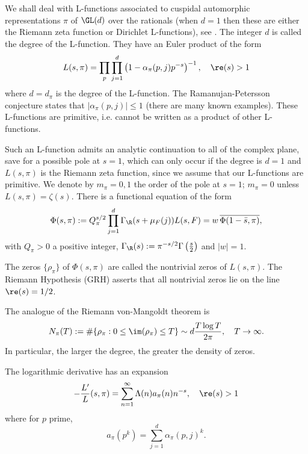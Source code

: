 \documentclass[12pt]{amsart}
\begin{document}
We shall deal with L-functions associated to cuspidal automorphic representations $\pi$ of $\GL(d)$ over the rationals   %
 (when $d=1$ then these are either the Riemann zeta function or Dirichlet L-functions), see \cite{RSDuke}. The integer $d$ is called the degree of the L-function. 
They have an Euler product of the form 
\[
L(s,\pi) = \prod_p \prod_{j=1}^{d} \left(1-\alpha_\pi(p,j) p^{-s} \right)^{-1},\quad \re(s)>1 
\] 
where $d=d_\pi$ is the degree of the L-function. 
The Ramanujan-Petersson conjecture states that $|\alpha_\pi(p,j)|\leq 1$ (there are many known examples). 
These L-functions are primitive, i.e. cannot be written as a product of other L-functions.  

Such an L-function  admits an analytic continuation to all of the complex plane, save for a possible pole at $s=1$, which can only occur if the degree is $d=1$ and $L(s,\pi)$ is   the Riemann zeta function, since we assume that our L-functions are primitive. We denote by $m_\pi=0,1$ the order of the pole at $s=1$; $m_\pi=0$ unless $L(s,\pi)=\zeta(s)$. There is a functional equation of the form 
\[
\Phi(s,\pi):=Q_\pi^{s/2} \prod_{j=1}^d \Gamma_\R(s+\mu_F(j))L(s,F) = w \,\overline{\Phi(1-\bar s,\pi)},
\]  
with $Q_\pi>0$ a positive integer, $\Gamma_\R(s):=\pi^{-s/2}\Gamma\left( \frac s2 \right)$ and $|w|=1$. 
   

The zeros $\{\rho_\pi\}$ of $\Phi(s,\pi)$ are called the nontrivial zeros of $L(s,\pi)$. 
The Riemann Hypothesis (GRH) asserts that all nontrivial zeros   lie on the line $\re(s)=1/2$.

The analogue of the Riemann von-Mangoldt theorem is 
\begin{equation}\label{Riemann-von Mangoldt}
N_\pi(T):=\#\{\rho_\pi: 0\leq \im(\rho_\pi)\leq T\} \sim d \frac{T \log T}{2\pi}, \quad T\to \infty. 
\end{equation}
In particular, the larger the degree, the greater the density of zeros.


The logarithmic derivative has an expansion
\[
-\frac{L'}{L}(s,\pi) = \sum_{n=1}^\infty \Lambda(n) a_\pi(n) n^{-s}, \quad \re(s)>1
\]
where for $p$ prime,
\[
a_\pi(p^k) =\sum_{j=1}^d \alpha_\pi(p,j)^k.  
\]
\end{document}
